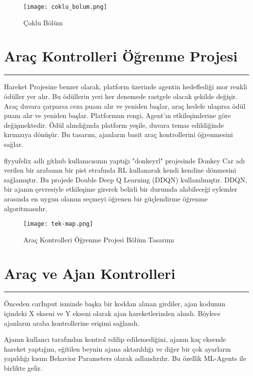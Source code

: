 \documentclass{article}
\begin{document}
\begin{figure}[h]
    \begin{center}
        \texttt{[image: coklu\_bolum.png]}
    \end{center}
      \caption{Çoklu Bölüm}
\end{figure}

\newpage

\section{Araç Kontrolleri Öğrenme Projesi}
\rule{\textwidth}{0.5pt}
\par Hareket Projesine benzer olarak, platform üzerinde agentin hedeflediği mor renkli ödüller yer alır. Bu ödüllerin yeri her denemede rastgele olacak şekilde değişir. Araç duvara çarparsa ceza puanı alır ve yeniden başlar, araç hedefe ulaşırsa ödül puanı alır ve yeniden başlar. Platformun rengi, Agent'ın etkileşimlerine göre değişmektedir. Ödül alındığında platform yeşile, duvara temas edildiğinde kırmızıya dönüşür. Bu tasarım, ajanların basit araç kontrollerini öğrenmesini sağlar.
\newline
\par flyyufelix adlı github kullanıcısının yaptığı "donkeyrl" projesinde\cite{flyyufelix} Donkey Car adı verilen bir arabanın bir pist etrafında RL kullanarak kendi kendine dönmesini sağlamıştır. Bu projede Double Deep Q Learning (DDQN) kullanılmıştır. DDQN, bir ajanın çevresiyle etkileşime girerek belirli bir durumda alabileceği eylemler arasında en uygun olanını seçmeyi öğrenen bir güçlendirme öğrenme algoritmasıdır.\\[15pt]

\begin{figure}[h]
    \begin{center}
        \texttt{[image: tek-map.png]}
    \end{center}
      \caption{Araç Kontrolleri Öğrenme Projesi Bölüm Tasarımı}
\end{figure}

\newpage

\section{Araç ve Ajan Kontrolleri}
\rule{\textwidth}{0.5pt}
\par Önceden carInput isminde başka bir koddan alınan girdiler, ajan kodunun içindeki X ekseni ve Y ekseni olarak ajan hareketlerinden alındı. Böylece ajanların araba kontrollerine erişimi sağlandı. 
\newline
\par Ajanın kullancı tarafından kontrol edilip edilemediğini, ajanın kaç eksende hareket yaptığını, eğitilen beynin ajana aktarıldığı ve diğer bir çok ayarların yapıldığı kısım Behavior Parameters olarak adlandırılır. Bu özellik ML-Agents ile birlikte gelir.\\[5pt]
\end{document}
